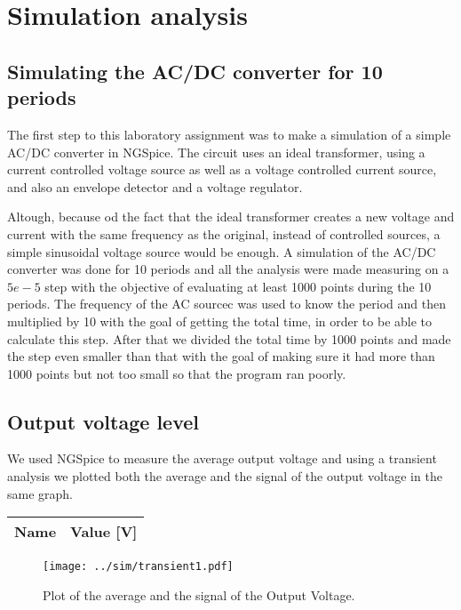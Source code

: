 \section{Simulation analysis}
\label{sec:simulation}

\subsection{Simulating the AC/DC converter for 10 periods}
The first step to this laboratory assignment was to make a simulation of a simple AC/DC converter in NGSpice. The circuit uses an ideal transformer, using a current controlled voltage source as well as a voltage controlled current source, and also an envelope detector and a voltage regulator. \par
Altough, because od the fact that the ideal transformer creates a new voltage and current with the same frequency as the original, instead of controlled sources, a simple sinusoidal voltage source would be enough.
A simulation of the AC/DC converter was done for 10 periods and all the analysis were made measuring on a $5e-5$ step with the objective of evaluating at least 1000 points during the 10 periods. The frequency of the AC sourcec was used to know the period and then multiplied by 10 with the goal of getting the total time, in order to be able to calculate this step. After that we divided the total time by 1000 points and made the step even smaller than that with the goal of making sure it had more than 1000 points but not too small so that the program ran poorly. \par


\subsection{Output voltage level}
We used NGSpice to measure the average output voltage and using a transient analysis we plotted both the average and the signal of the output voltage in the same graph.

\begin{table}[H]
  \centering
  \begin{tabular}{|l|r|}
    \hline    
    {\bf Name} & {\bf Value [V]} \\ \hline
    
  \end{tabular}
  \label{tab:average}
\end{table}

\begin{figure}[H] \centering
\texttt{[image: ../sim/transient1.pdf]}
\caption{Plot of the average and the signal of the Output Voltage.}
\label{fig:transient1}
\end{figure}

